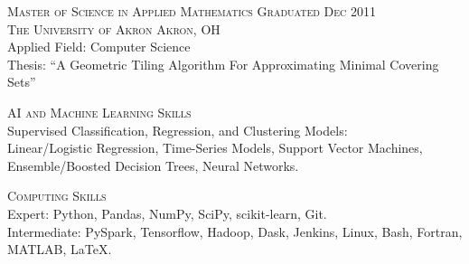 \documentclass[letterpaper, 10pt]{article} %
\begin{document}
\textsc{Master of Science in Applied Mathematics} \hfill \textsc{Graduated Dec 2011} \\
\textsc{The University of Akron \hfill Akron, OH} \\
Applied Field: Computer Science \\
Thesis: ``A Geometric Tiling Algorithm For Approximating Minimal Covering Sets'' \





\textsc{AI and Machine Learning Skills} \\
    Supervised Classification, Regression, and Clustering Models: \\
    Linear/Logistic Regression,
    Time-Series Models,
    Support Vector Machines,
    Ensemble/Boosted Decision Trees,
    Neural Networks.

    
\textsc{Computing Skills} \\
    Expert:
        Python,
        Pandas,
        NumPy,
        SciPy,
        scikit-learn,
        Git. \\
    Intermediate:
        PySpark,
        Tensorflow,
        Hadoop,
        Dask,
        Jenkins,
        Linux,
        Bash,
        Fortran,
        MATLAB,
        \LaTeX. \\

\vspace*{\fill}
\end{document}
